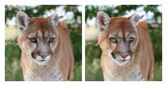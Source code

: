 \begin{figure}[h]
    \begin{minipage}{0.15\textwidth}
        \centering
        \includegraphics[width=\linewidth]{material/origin/224.png}
    \end{minipage}
    \begin{minipage}{0.15\textwidth}
        \centering
        \includegraphics[width=\linewidth]{material/vq/224.png}

\end{minipage}
\end{figure}
